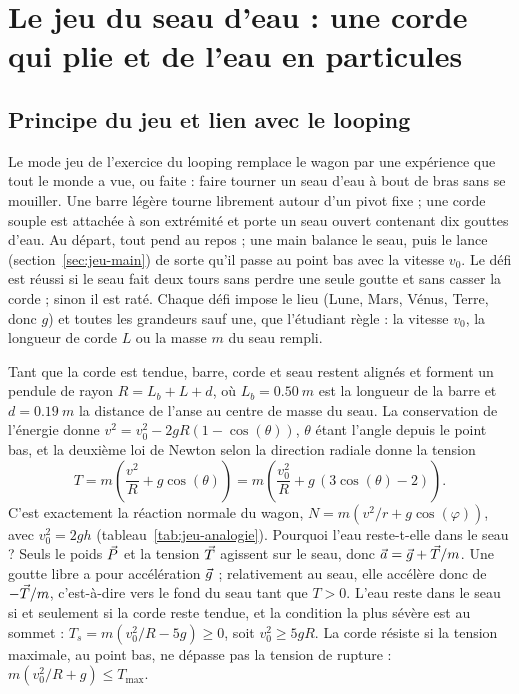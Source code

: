 
\chapter{Le jeu du seau d'eau : une corde qui plie et de l'eau en particules}
\label{chap:jeu}

\section{Principe du jeu et lien avec le looping}

Le mode jeu de l'exercice du looping remplace le wagon par une expérience que
tout le monde a vue, ou faite : faire tourner un seau d'eau à bout de bras sans
se mouiller. Une barre légère tourne librement autour d'un pivot fixe ; une corde
souple est attachée à son extrémité et porte un seau ouvert contenant dix gouttes
d'eau. Au départ, tout pend au repos ; une main balance le seau, puis le lance
(section~\ref{sec:jeu-main}) de sorte qu'il passe au point bas avec la vitesse
\(v_0\). Le défi est réussi si le seau fait deux tours sans
perdre une seule goutte et sans casser la corde ; sinon il est raté. Chaque défi
impose le lieu (Lune, Mars, Vénus, Terre, donc \(g\)) et toutes les grandeurs
sauf une, que l'étudiant règle : la vitesse \(v_0\), la longueur de corde \(L\)
ou la masse \(m\) du seau rempli.

Tant que la corde est tendue, barre, corde et seau restent alignés et forment
un pendule de rayon \(R = L_b + L + d\), où \(L_b = \SI{0,50}{m}\) est la longueur
de la barre et \(d = \SI{0,19}{m}\) la distance de l'anse au centre de masse du
seau. La conservation de l'énergie donne \(v^2 = v_0^2 - 2 g R (1 - \cos(\theta))\),
\(\theta\) étant l'angle depuis le point bas, et la deuxième loi de Newton selon
la direction radiale donne la tension
\begin{equation}
  T = m \left(\frac{v^2}{R} + g \cos(\theta)\right)
    = m \left(\frac{v_0^2}{R} + g \, (3 \cos(\theta) - 2)\right).
  \label{eq:jeu-tension}
\end{equation}
C'est exactement la réaction normale du wagon, \(N = m (v^2/r + g \cos(\varphi))\),
avec \(v_0^2 = 2 g h\) (tableau~\ref{tab:jeu-analogie}). Pourquoi l'eau reste-t-elle
dans le seau ? Seuls le poids \(\vec{P}\) et la tension \(\vec{T}\) agissent sur
le seau, donc \(\vec{a} = \vec{g} + \vec{T}/m\). Une goutte libre a pour
accélération \(\vec{g}\) ; relativement au seau, elle accélère donc de
\(-\vec{T}/m\), c'est-à-dire vers le fond du seau tant que \(T > 0\). L'eau
reste dans le seau si et seulement si la corde reste tendue, et la condition la
plus sévère est au sommet : \(T_s = m (v_0^2/R - 5 g) \geq 0\), soit
\(v_0^2 \geq 5 g R\). La corde résiste si la tension maximale, au point bas, ne
dépasse pas la tension de rupture : \(m (v_0^2/R + g) \leq T_{\max}\).

